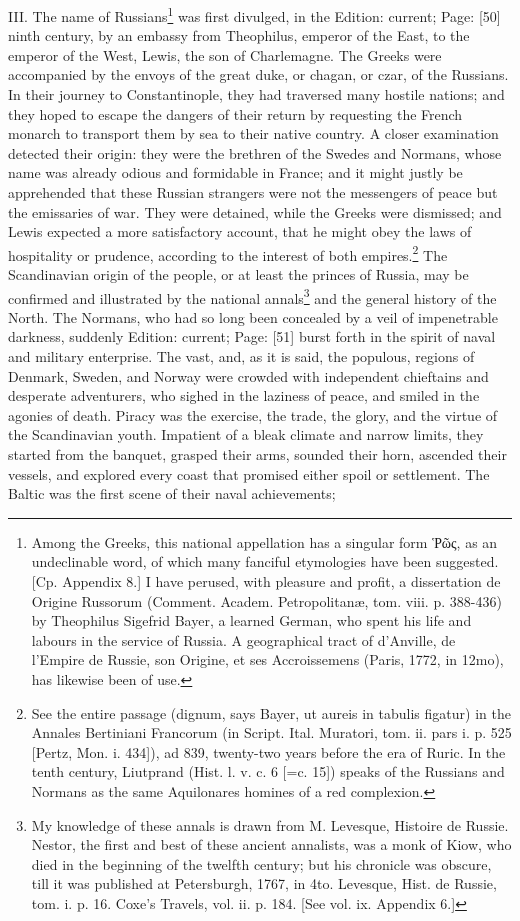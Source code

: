 III. The name of Russians\footnote{Among the Greeks, this national appellation has a singular form \textgreek{\texthebrew{Ῥῶ}ς}, as an undeclinable word, of which many fanciful etymologies have been suggested. [Cp. Appendix 8.] I have perused, with pleasure and profit, a dissertation de Origine Russorum (Comment. Academ. Petropolitanæ, tom. viii. p. 388-436) by Theophilus Sigefrid Bayer, a learned German, who spent his life and labours in the service of Russia. A geographical tract of d\texthebrew{}’Anville, de l\texthebrew{}’Empire de Russie, son Origine, et ses Accroissemens (Paris, 1772, in 12mo), has likewise been of use.} was first divulged, in the Edition: current; Page: [50] ninth century, by an embassy from Theophilus, emperor of the East, to the emperor of the West, Lewis, the son of Charlemagne. The Greeks were accompanied by the envoys of the great duke, or chagan, or czar, of the Russians. In their journey to Constantinople, they had traversed many hostile nations; and they hoped to escape the dangers of their return by requesting the French monarch to transport them by sea to their native country. A closer examination detected their origin: they were the brethren of the Swedes and Normans, whose name was already odious and formidable in France; and it might justly be apprehended that these Russian strangers were not the messengers of peace but the emissaries of war. They were detained, while the Greeks were dismissed; and Lewis expected a more satisfactory account, that he might obey the laws of hospitality or prudence, according to the interest of both empires.\footnote{See the entire passage (dignum, says Bayer, ut aureis in tabulis figatur) in the Annales Bertiniani Francorum (in Script. Ital. Muratori, tom. ii. pars i. p. 525 [Pertz, Mon. i. 434]), ad 839, twenty-two years before the era of Ruric. In the tenth century, Liutprand (Hist. l. v. c. 6 [=c. 15]) speaks of the Russians and Normans as the same Aquilonares homines of a red complexion.} The Scandinavian origin of the people, or at least the princes of Russia, may be confirmed and illustrated by the national annals\footnote{My knowledge of these annals is drawn from M. Levesque, Histoire de Russie. Nestor, the first and best of these ancient annalists, was a monk of Kiow, who died in the beginning of the twelfth century; but his chronicle was obscure, till it was published at Petersburgh, 1767, in 4to. Levesque, Hist. de Russie, tom. i. p. 16. Coxe\texthebrew{}’s Travels, vol. ii. p. 184. [See vol. ix. Appendix 6.]} and the general history of the North. The Normans, who had so long been concealed by a veil of impenetrable darkness, suddenly Edition: current; Page: [51] burst forth in the spirit of naval and military enterprise. The vast, and, as it is said, the populous, regions of Denmark, Sweden, and Norway were crowded with independent chieftains and desperate adventurers, who sighed in the laziness of peace, and smiled in the agonies of death. Piracy was the exercise, the trade, the glory, and the virtue of the Scandinavian youth. Impatient of a bleak climate and narrow limits, they started from the banquet, grasped their arms, sounded their horn, ascended their vessels, and explored every coast that promised either spoil or settlement. The Baltic was the first scene of their naval achievements; 